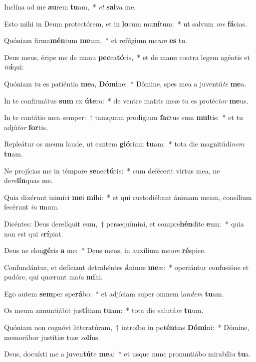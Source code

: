 \item Inclína ad me \textbf{au}rem \textbf{tu}am,~* \textit{et} \textbf{sal}va me.
\item Esto mihi in Deum protectórem, et in \textbf{lo}cum mu\textbf{ní}tum:~* ut salvum \textit{me} \textbf{fá}cias.
\item Quóniam firma\textbf{mén}tum \textbf{me}um,~* et refúgium me\textit{um} \textbf{es} tu.
\item Deus meus, éripe me de manu \textbf{pec}ca\textbf{tó}ris,~* et de manu contra legem agéntis et \textit{in}\textbf{í}qui:
\item Quóniam tu es patiéntia \textbf{me}a, \textbf{Dó}\textbf{mi}ne:~* Dómine, spes mea a juventú\textit{te} \textbf{me}a.
\item In te confirmátus \textbf{sum} ex \textbf{ú}\textbf{te}ro:~* de ventre matris meæ tu es protéc\textit{tor} \textbf{me}us.
\item In te cantátio mea semper:~† tamquam prodígium \textbf{fac}tus sum \textbf{mul}tis:~* et tu adjú\textit{tor} \textbf{for}tis.
\item Repleátur os meum laude, ut cantem \textbf{gló}riam \textbf{tu}am:~* tota die magnitúdi\textit{nem} \textbf{tu}am.
\item Ne projícias me in témpore \textbf{se}nec\textbf{tú}tis:~* cum defécerit virtus mea, ne de\textit{re}\textbf{lín}quas me.
\item Quia dixérunt inimíci \textbf{me}i \textbf{mi}hi:~* et qui custodiébant ánimam meam, consílium fecérunt \textit{in} \textbf{u}num.
\item Dicéntes: Deus derelíquit eum,~† persequímini, et compre\textbf{hén}dite \textbf{e}um:~* quia non est qui \textit{e}\textbf{rí}piat.
\item Deus ne elon\textbf{gé}ris \textbf{a} me:~* Deus meus, in auxílium me\textit{um} \textbf{ré}spice.
\item Confundántur, et defíciant detrahéntes \textbf{á}nimæ \textbf{me}æ:~* operiántur confusióne et pudóre, qui quærunt ma\textit{la} \textbf{mi}hi.
\item Ego autem \textbf{sem}per spe\textbf{rá}bo:~* et adjíciam super omnem lau\textit{dem} \textbf{tu}am.
\item Os meum annuntiábit jus\textbf{tí}tiam \textbf{tu}am:~* tota die salutá\textit{re} \textbf{tu}um.
\item Quóniam non cognóvi litteratúram,~† introíbo in pot\textbf{én}tias \textbf{Dó}\textbf{mi}ni:~* Dómine, memorábor justítiæ tuæ \textit{so}\textbf{lí}us.
\item Deus, docuísti me a juven\textbf{tú}te \textbf{me}a:~* et usque nunc pronuntiábo mirabíli\textit{a} \textbf{tu}a.
